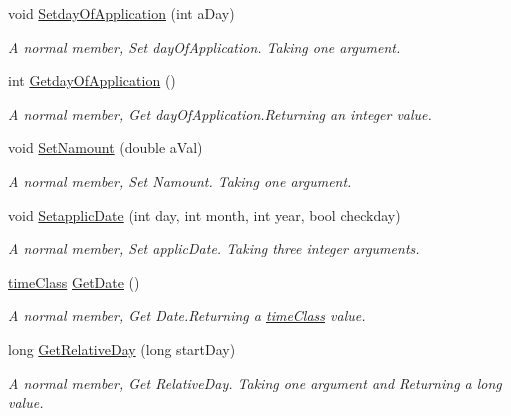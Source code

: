 \begin{DoxyCompactItemize}
void \mbox{\hyperlink{classfert_record_adc04d144e402f5b5c21d1b08e1250753}{Setday\+Of\+Application}} (int a\+Day)
\begin{DoxyCompactList}\small\item\em A normal member, Set day\+Of\+Application. Taking one argument. \end{DoxyCompactList}\item 
int \mbox{\hyperlink{classfert_record_a2fbd7cc091c52650dbd0f96619a1dcbe}{Getday\+Of\+Application}} ()
\begin{DoxyCompactList}\small\item\em A normal member, Get day\+Of\+Application.\+Returning an integer value. \end{DoxyCompactList}\item 
void \mbox{\hyperlink{classfert_record_a1e979e3a311164a93aba804e04391098}{Set\+Namount}} (double a\+Val)
\begin{DoxyCompactList}\small\item\em A normal member, Set Namount. Taking one argument. \end{DoxyCompactList}\item 
void \mbox{\hyperlink{classfert_record_a35c104976fbb6e54f4d07d02e619f455}{Setapplic\+Date}} (int day, int month, int year, bool checkday)
\begin{DoxyCompactList}\small\item\em A normal member, Set applic\+Date. Taking three integer arguments. \end{DoxyCompactList}\item 
\mbox{\hyperlink{classtime_class}{time\+Class}} \mbox{\hyperlink{classfert_record_a1e2f4731531fa9da8db76417ad42df1c}{Get\+Date}} ()
\begin{DoxyCompactList}\small\item\em A normal member, Get Date.\+Returning a \mbox{\hyperlink{classtime_class}{time\+Class}} value. \end{DoxyCompactList}\item 
long \mbox{\hyperlink{classfert_record_a54e59e6321610b1d3f5b323932f2347a}{Get\+Relative\+Day}} (long start\+Day)
\begin{DoxyCompactList}\small\item\em A normal member, Get Relative\+Day. Taking one argument and Returning a long value. \end{DoxyCompactList}\end{DoxyCompactItemize}
